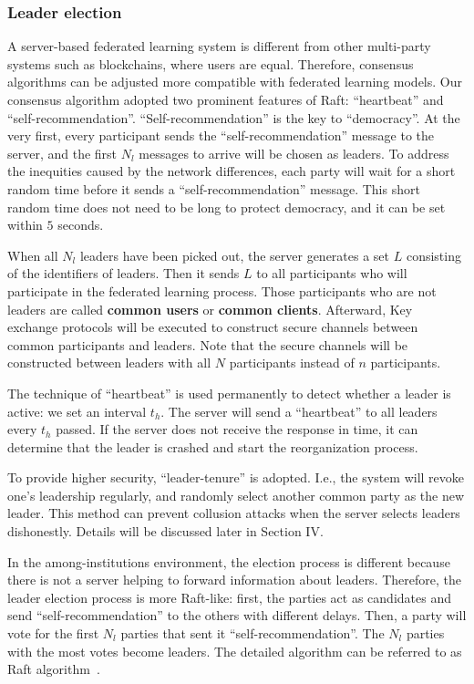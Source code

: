 \subsubsection{\textbf{Leader election}}
A server-based federated learning system is different from other multi-party systems such as blockchains, where users are equal. Therefore, consensus algorithms can be adjusted more compatible with federated learning models. Our consensus algorithm adopted two prominent features of Raft: ``heartbeat'' and ``self-recommendation''. ``Self-recommendation'' is the key to ``democracy''. At the very first, every participant sends the ``self-recommendation'' message to the server, and the first $N_l$ messages to arrive will be chosen as leaders. To address the inequities caused by the network differences, each party will wait for a short random time before it sends a ``self-recommendation'' message. This short random time does not need to be long to protect democracy, and it can be set within $5$ seconds. 

When all $N_l$ leaders have been picked out, the server generates a set $L$ consisting of the identifiers of leaders. Then it sends $L$ to all participants who will participate in the federated learning process. Those participants who are not leaders are called \textbf{common users} or \textbf{common clients}. Afterward, Key exchange protocols will be executed to construct secure channels between common participants and leaders. Note that the secure channels will be constructed between leaders with all $N$ participants instead of $n$ participants.

The technique of ``heartbeat'' is used permanently to detect whether a leader is active: we set an interval $t_h$. The server will send a ``heartbeat'' to all leaders every $t_h$ passed. If the server does not receive the response in time, it can determine that the leader is crashed and start the reorganization process.

To provide higher security, ``leader-tenure'' is adopted. I.e., the system will revoke one's leadership regularly, and randomly select another common party as the new leader. This method can prevent collusion attacks when the server selects leaders dishonestly. Details will be discussed later in Section IV. 

In the among-institutions environment, the election process is different because there is not a server helping to forward information about leaders. Therefore, the leader election process is more Raft-like: first, the parties act as candidates and send ``self-recommendation'' to the others with different delays. Then, a party will vote for the first $N_l$ parties that sent it ``self-recommendation''. The $N_l$ parties with the most votes become leaders. The detailed algorithm can be referred to as Raft algorithm~\cite{Raft}.

